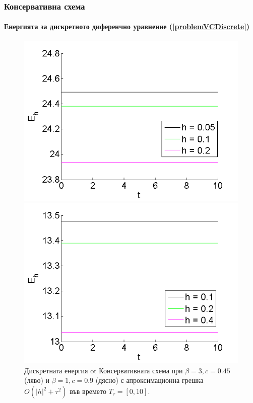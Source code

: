 \documentclass{beamer}
\newcommand{\rf}[1]{(\ref{#1})}
\begin{document}
\begin{frame}

\frametitle{Консервативна схема}
\framesubtitle{Енергията за дискретното диференчно уравнение \rf{problemVCDiscrete}}

\begin{figure}[ht]\vspace{0.02cm}
	\begin{minipage}[b]{0.48\linewidth}
		\includegraphics[width=\linewidth]{../amitans/figures/Energy_EnergySave_bt3_c045_x3O.png}	
	\end{minipage}
	\begin{minipage}[b]{0.48\linewidth}
		 \includegraphics[width=\linewidth]{../amitans/figures/Energy_EnergySave_bt1_c090_x3O.png}
	\end{minipage}
\caption{Дискретната енергия ot Консервативната схема при $\beta=3,c=0.45$ (ляво) и $\beta=1,c=0.9$ (дясно) с апроксимационна грешка $O(|h|^2 + \tau^2)$ във времето $T_{\tau} = [0, 10]$.}
\label{EnOnly}
\end{figure}

\end{frame}
\end{document}
